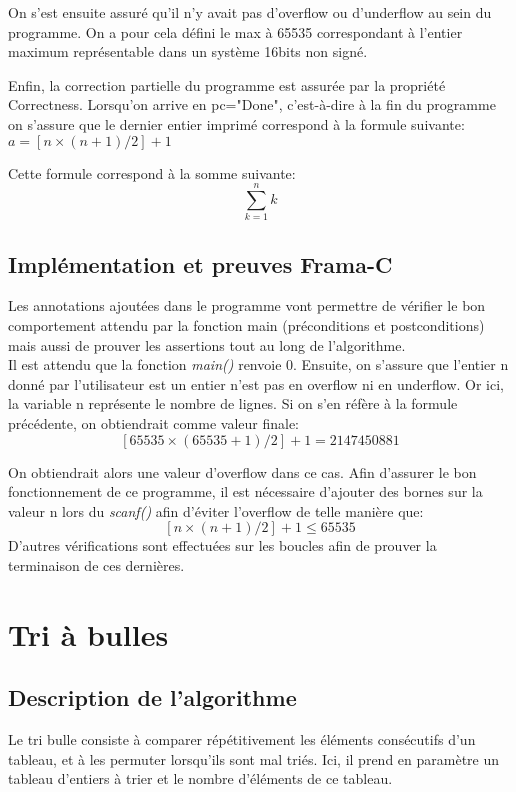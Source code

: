 \documentclass[a4paper,11pt, oneside]{book}
\begin{document}
			On s'est ensuite assuré qu'il n'y avait pas d'overflow ou d'underflow au sein
			du programme. On a pour cela défini le max à 65535 correspondant à l'entier
			maximum représentable dans un système 16bits non signé.

			Enfin, la correction partielle du programme est assurée par la propriété
			Correctness. Lorsqu'on arrive en pc="Done", c'est-à-dire à la fin du programme
			on s'assure que le dernier entier imprimé correspond à la formule suivante:
			$a = [n \times (n + 1) / 2] + 1$

			Cette formule correspond à la somme suivante: $$\sum_{k=1}^{n}k$$

		\section{Implémentation et preuves Frama-C}
		Les annotations ajoutées dans le programme vont permettre de
		vérifier le bon comportement attendu par la fonction main (préconditions et postconditions) mais
		aussi de prouver les assertions tout au long de l'algorithme.\\

		\noindent Il est attendu que la fonction \textit{main()} renvoie 0. Ensuite,
		on s'assure que l'entier n donné par l'utilisateur est un entier n'est pas en overflow ni en underflow.
		Or ici, la variable n représente le nombre de lignes. Si on s'en réfère à la
		formule précédente, on obtiendrait comme valeur finale:
		$$[65535 \times (65535 + 1) / 2] + 1 = 2147450881$$

		\noindent On obtiendrait alors une valeur d'overflow dans ce cas. Afin d'assurer le bon
		fonctionnement de ce programme, il est nécessaire d'ajouter des bornes sur la valeur n lors
		du \textit{scanf()} afin d'éviter l'overflow de telle manière que:
		$$[n \times (n + 1) / 2] + 1 	\leq 65535$$
		\noindent D'autres vérifications sont effectuées sur les boucles afin de prouver la terminaison de ces dernières.

	\chapter{Tri à bulles}

		\section{Description de l'algorithme}

		Le tri bulle consiste à comparer répétitivement les éléments consécutifs d'un tableau,
		et à les permuter lorsqu'ils sont mal triés. Ici, il prend en paramètre un
		tableau d'entiers à trier et le nombre d'éléments de ce tableau.
\end{document}
